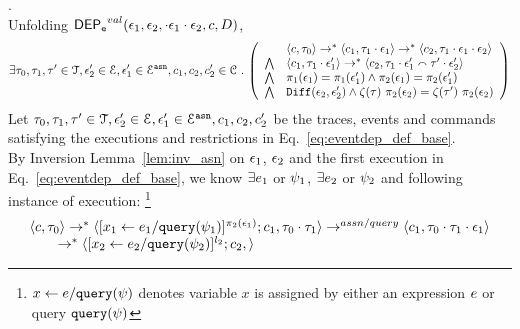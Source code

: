 \begin{subproof}.
\label{pf:alg_correct_base}
\\
Unfolding $\mathsf{DEP_{\mathtt{e}}}^{val}(\mathtt{\epsilon}_1, \mathtt{\epsilon}_2, \cdot \mathtt{\epsilon}_1 \cdot \mathtt{\epsilon}_2, c, D)$, 
\begin{equation}
\label{eq:eventdep_def_base}
\exists \vtrace_0,
\vtrace_1, \vtrace' \in \mathcal{T}, \event_2' \in \eventset, \event_1' \in \eventset^{\asn}, {c}_1, {c}_2,  {c}_2' \in \cdom \st
  \left(
  \begin{array}{ll}   
 & \config{{c}, \vtrace_0} \rightarrow^{*} 
\config{{c}_1, \vtrace_1 \cdot \event_1}  \rightarrow^{*} 
  \config{{c}_2,  \vtrace_1 \cdot \event_1 \cdot \event_2 } 
 \\ 
 \bigwedge &
  \config{{c}_1, \vtrace_1 \cdot \event_1'}  \rightarrow^{*} 
  \config{{c}_2,  \vtrace_1 \cdot \event_1' \tracecat \vtrace' \cdot \event_2' } 
\\
\bigwedge &  \pi_1(\event_1) = \pi_1(\event_1') \land \pi_2(\event_1) = \pi_2(\event_1') 
\\
\bigwedge & 
\diff(\event_2,\event_2' ) \land 
\vcounter(\vtrace) ~ \pi_2(\event_2)
= 
\vcounter(\vtrace') ~ \pi_2(\event_2)\\
\end{array}
\right)
\end{equation}
%
Let $\mathtt{\tau}_0,
\mathtt{\tau}_1, \mathtt{\tau}' \in \mathcal{T}, \mathtt{\epsilon}_2' \in \mathcal{E}, \mathtt{\epsilon}_1' \in \mathcal{E}^{\mathtt{{asn}}}, {c}_1, {c}_2,  {c}_2'$ be the traces, events and commands satisfying the executions and restrictions in Eq.~\ref{eq:eventdep_def_base}.
\\
By Inversion Lemma~\ref{lem:inv_asn} on 
 $\mathtt{\epsilon}_1$, $\mathtt{\epsilon}_2$ and the first execution in Eq.~\ref{eq:eventdep_def_base},
 we know $\exists e_1$ or $\psi_1$, $\exists e_2$ or $\psi_2$ and following instance of execution:
%
\footnote{
$\mathrel{ x \leftarrow e / {\tt query}(\psi) }$ denotes variable $x$ is assigned by either an expression $e$ or query ${\tt query}(\psi)$
}
\begin{equation}
\label{eq:valdep_inv1}
  \begin{array}{l}   
\langle {c}, \mathtt{\tau}_0 \rangle \rightarrow^{*} 
\langle [\mathrel{ x_1 \leftarrow e_1 / {\tt query}(\psi_1) }]^{\pi_2(\mathtt{\epsilon}_1)} ; {c}_1, \mathtt{\tau}_0 \cdot \mathtt{\tau}_1 \rangle  
\rightarrow^{assn/query}
 \langle c_1, \mathtt{\tau}_0 \cdot \mathtt{\tau}_1 \cdot \mathtt{\epsilon}_1 \rangle \\
  \qquad \rightarrow^{*} 
  \langle [\mathrel{ {x}_2 \leftarrow e_2 / {\tt query}(\psi_2) }]^{l_2};{c}_2, 
 \rangle
\end{array}
\end{equation}
\end{subproof}
